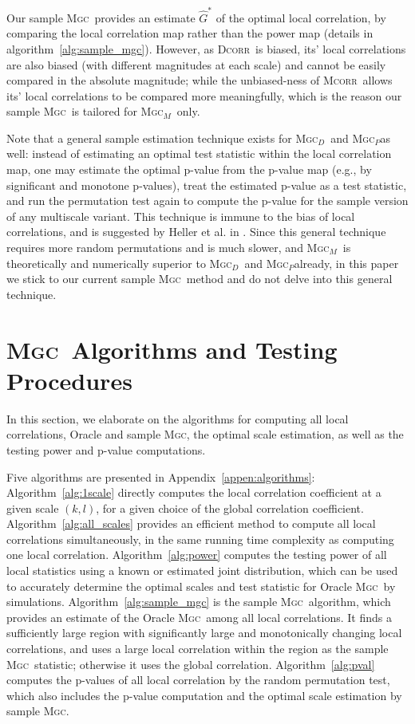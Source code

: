 \documentclass[11pt]{article}
\providecommand{\sct}[1]{{\normalfont\textsc{#1}}}
\newcommand{\Mgc}{\sct{Mgc}}
\newcommand{\Mgcp}{\sct{Mgc$_P$}}
\newcommand{\Mgcd}{\sct{Mgc$_D$}}
\newcommand{\Mgcm}{\sct{Mgc$_M$}}
\newcommand{\Dcorr}{\sct{Dcorr}}
\newcommand{\Mcorr}{\sct{Mcorr}}
\begin{document}
Our sample \Mgc~provides an estimate $\hat{G}^{*}$ of the optimal local correlation, by comparing the local correlation map rather than the power map (details in algorithm~\ref{alg:sample_mgc}). However, as \Dcorr~is biased, its' local correlations are also biased (with different magnitudes at each scale) and cannot be easily compared in the absolute magnitude; while the unbiased-ness of \Mcorr~allows its' local correlations to be compared more meaningfully, which is the reason our sample \Mgc~is tailored for \Mgcm~only. 

Note that a general sample estimation technique exists for \Mgcd~and \Mgcp as well: instead of estimating an optimal test statistic within the local correlation map, one may estimate the optimal p-value from the p-value map (e.g., by significant and monotone p-values), treat the estimated p-value as a test statistic, and run the permutation test again to compute the p-value for the sample version of any multiscale variant. This technique is immune to the bias of local correlations, and is suggested by Heller et al. in \cite{heller2016consistent}. Since this general technique requires more random permutations and is much slower, and \Mgcm~is theoretically and numerically superior to \Mgcd~and \Mgcp already, in this paper we stick to our current sample \Mgc~method and do not delve into this general technique.

\section{\Mgc~Algorithms and Testing Procedures}
\label{appen:tests}
In this section, we elaborate on the algorithms for computing all local correlations, Oracle and sample \Mgc, the optimal scale estimation, as well as the testing power and p-value computations.

Five algorithms are presented in Appendix~\ref{appen:algorithms}: Algorithm~\ref{alg:1scale} directly computes the local correlation coefficient at a given scale $(k,l)$, for a given choice of the global correlation coefficient.
Algorithm~\ref{alg:all_scales} provides an efficient method to compute all local correlations simultaneously, in the same running time complexity as computing one local correlation. 
Algorithm~\ref{alg:power} computes the testing power of all local statistics using a known or estimated joint distribution, which can be used to accurately determine the optimal scales and test statistic for Oracle \Mgc~by simulations. 
Algorithm~\ref{alg:sample_mgc} is the sample \Mgc~algorithm, which provides an estimate of the Oracle \Mgc~among all local correlations. It finds a sufficiently large region with significantly large and monotonically changing local correlations, and uses a large local correlation within the region as the sample \Mgc~statistic; otherwise it uses the global correlation. %
Algorithm~\ref{alg:pval} computes the p-values of all local correlation by the random permutation test, which also includes the p-value computation and the optimal scale estimation by sample \Mgc.
\end{document}
